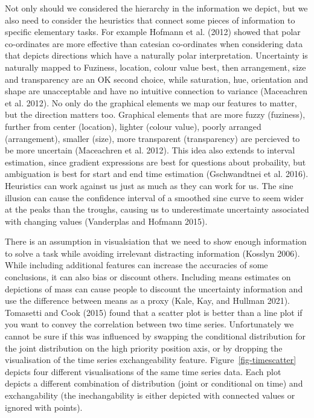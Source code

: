 \documentclass[
  letterpaper,
  DIV=11,
  numbers=noendperiod]{scrartcl}
\begin{document}
Not only should we considered the hierarchy in the information we
depict, but we also need to consider the heuristics that connect some
pieces of information to specific elementary tasks. For example Hofmann
et al. (2012) showed that polar co-ordinates are more effective than
catesian co-ordinates when considering data that depicts directions
which have a naturally polar interpretation. Uncertainty is naturally
mapped to Fuziness, location, colour value best, then arrangement, size
and transparency are an OK second choice, while saturation, hue,
orientation and shape are unacceptable and have no intuitive connection
to variance (Maceachren et al. 2012). No only do the graphical elements
we map our features to matter, but the direction matters too. Graphical
elements that are more fuzzy (fuziness), further from center (location),
lighter (colour value), poorly arranged (arrangement), smaller (size),
more transparent (transparency) are percieved to be more uncertain
(Maceachren et al. 2012). This idea also extends to interval estimation,
since gradient expressions are best for questions about probaility, but
ambiguation is best for start and end time estimation (Gschwandtnei et
al. 2016). Heuristics can work against us just as much as they can work
for us. The sine illusion can cause the confidence interval of a
smoothed sine curve to seem wider at the peaks than the troughs, causing
us to underestimate uncertainty associated with changing values
(Vanderplas and Hofmann 2015).

There is an assumption in visualsiation that we need to show enough
information to solve a task while avoiding irrelevant distracting
information (Kosslyn 2006). While including additional features can
increase the accuracies of some conclusions, it can also bias or
discount others. Including means estimates on depictions of mass can
cause people to discount the uncertainty information and use the
difference between means as a proxy (Kale, Kay, and Hullman 2021).
Tomasetti and Cook (2015) found that a scatter plot is better than a
line plot if you want to convey the correlation between two time series.
Unfortunately we cannot be sure if this was influenced by swapping the
conditional distribution for the joint distribution on the high priority
position axis, or by dropping the visualisation of the time series
exchangeability feature. Figure~\ref{fig-timescatter} depicts four
different visualisations of the same time series data. Each plot depicts
a different combination of distribution (joint or conditional on time)
and exchangability (the inechangability is either depicted with
connected values or ignored with points).
\end{document}
